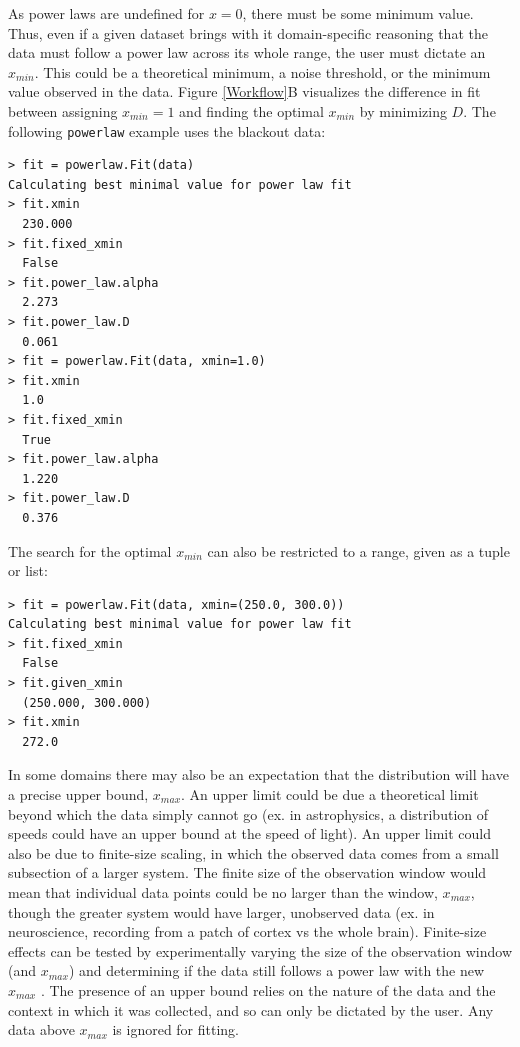 \documentclass[10pt]{article}
\begin{document}
As power laws are undefined for $x=0$, there must be some minimum value. Thus, even if a given dataset brings with it domain-specific reasoning that the data must follow a power law across its whole range, the user must dictate an $x_{min}$. This could be a theoretical minimum, a noise threshold, or the minimum value observed in the data. Figure \ref{Workflow}B visualizes the difference in fit between assigning $x_{min}=1$ and finding the optimal $x_{min}$ by minimizing $D$. The following \verb$powerlaw$ example uses the blackout data:

\begin{verbatim}
> fit = powerlaw.Fit(data)
Calculating best minimal value for power law fit
> fit.xmin
  230.000
> fit.fixed_xmin
  False
> fit.power_law.alpha
  2.273
> fit.power_law.D
  0.061
> fit = powerlaw.Fit(data, xmin=1.0)
> fit.xmin
  1.0
> fit.fixed_xmin
  True
> fit.power_law.alpha
  1.220
> fit.power_law.D
  0.376
\end{verbatim}

The search for the optimal $x_{min}$ can also be restricted to a range, given as a tuple or list:
\begin{verbatim}
> fit = powerlaw.Fit(data, xmin=(250.0, 300.0))
Calculating best minimal value for power law fit
> fit.fixed_xmin
  False
> fit.given_xmin
  (250.000, 300.000)
> fit.xmin
  272.0
\end{verbatim}

In some domains there may also be an expectation that the distribution will have a precise upper bound, $x_{max}$. An upper limit could be due a theoretical limit beyond which the data simply cannot go (ex. in astrophysics, a distribution of speeds could have an upper bound at the speed of light). An upper limit could also be due to finite-size scaling, in which the observed data comes from a small subsection of a larger system. The finite size of the observation window would mean that individual data points could be no larger than the window, $x_{max}$, though the greater system would have larger, unobserved data (ex. in neuroscience, recording from a patch of cortex vs the whole brain). Finite-size effects can be tested by experimentally varying the size of the observation window (and $x_{max}$) and determining if the data still follows a power law with the new $x_{max}$ \cite{Beggs2003, Shriki2013}. The presence of an upper bound relies on the nature of the data and the context in which it was collected, and so can only be dictated by the user. Any data above $x_{max}$ is ignored for fitting. 
\end{document}
